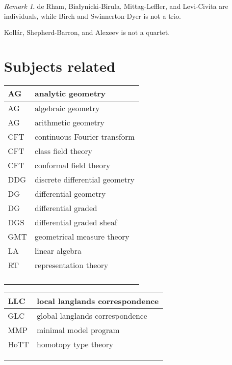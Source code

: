 \documentclass{amsart}
\numberwithin{equation}{section}
\theoremstyle{plain}
\numberwithin{equation}{section}
\theoremstyle{remark}
\newtheorem{remark}[theorem]{Remark}
\begin{document}
\begin{remark}
de Rham, Bia\l{}ynicki-Birula, Mittag-Leffler, and Levi-Civita are individuals, while Birch and Swinnerton-Dyer is not a trio.

Koll\'{a}r, Shepherd-Barron, and Alexeev is not a quartet.
\end{remark}


\section{Subjects related}

\begin{longtable}{l|l}
\hline
AG & analytic geometry \\ \hline
AG & algebraic geometry \\ \hline
AG & arithmetic geometry \\ \hline
CFT  & continuous Fourier transform\\ \hline
CFT & class field theory\\ \hline
CFT & conformal field theory\\ \hline
DDG & discrete differential geometry\\ \hline
DG & differential geometry\\ \hline
DG & differential graded\\ \hline
DGS & differential graded sheaf\\ \hline
GMT  & geometrical measure theory\\ \hline
LA & linear algebra  \\ \hline
RT & representation theory\\ \hline
 & \\ \hline
 & \\ \hline
 & \\ \hline
 & \\ \hline
\end{longtable}

\begin{longtable}{l|l}
\hline
LLC & local langlands correspondence \\ \hline
GLC & global langlands correspondence  \\ \hline
MMP & minimal model program\\ \hline
HoTT & homotopy type theory\\ \hline
 & \\ \hline
 & \\ \hline
 & \\ \hline
\end{longtable}
\end{document}
